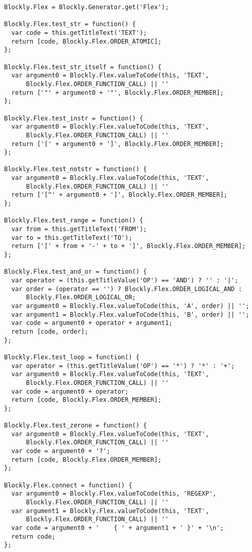 \documentclass{risepaper}
\begin{document}
\small
\begin{verbatim}
Blockly.Flex = Blockly.Generator.get('Flex');

Blockly.Flex.test_str = function() {
  var code = this.getTitleText('TEXT');
  return [code, Blockly.Flex.ORDER_ATOMIC];
};

Blockly.Flex.test_str_itself = function() {
  var argument0 = Blockly.Flex.valueToCode(this, 'TEXT',
      Blockly.Flex.ORDER_FUNCTION_CALL) || ''
  return ['"' + argument0 + '"', Blockly.Flex.ORDER_MEMBER];
};

Blockly.Flex.test_instr = function() {
  var argument0 = Blockly.Flex.valueToCode(this, 'TEXT',
      Blockly.Flex.ORDER_FUNCTION_CALL) || ''
  return ['[' + argument0 + ']', Blockly.Flex.ORDER_MEMBER];
};

Blockly.Flex.test_notstr = function() {
  var argument0 = Blockly.Flex.valueToCode(this, 'TEXT',
      Blockly.Flex.ORDER_FUNCTION_CALL) || ''
  return ['[^' + argument0 + ']', Blockly.Flex.ORDER_MEMBER];
};

Blockly.Flex.test_range = function() {
  var from = this.getTitleText('FROM');
  var to = this.getTitleText('TO');
  return ['[' + from + '-' + to + ']', Blockly.Flex.ORDER_MEMBER];
};

Blockly.Flex.test_and_or = function() {
  var operator = (this.getTitleValue('OP') == 'AND') ? '' : '|';
  var order = (operator == '') ? Blockly.Flex.ORDER_LOGICAL_AND :
      Blockly.Flex.ORDER_LOGICAL_OR;
  var argument0 = Blockly.Flex.valueToCode(this, 'A', order) || '';
  var argument1 = Blockly.Flex.valueToCode(this, 'B', order) || '';
  var code = argument0 + operator + argument1;
  return [code, order];
};

Blockly.Flex.test_loop = function() {
  var operator = (this.getTitleValue('OP') == '*') ? '*' : '+';
  var argument0 = Blockly.Flex.valueToCode(this, 'TEXT',
      Blockly.Flex.ORDER_FUNCTION_CALL) || ''
  var code = argument0 + operator;
  return [code, Blockly.Flex.ORDER_MEMBER];
};

Blockly.Flex.test_zerone = function() {
  var argument0 = Blockly.Flex.valueToCode(this, 'TEXT',
      Blockly.Flex.ORDER_FUNCTION_CALL) || ''
  var code = argument0 + '?';
  return [code, Blockly.Flex.ORDER_MEMBER];
};

Blockly.Flex.connect = function() {
  var argument0 = Blockly.Flex.valueToCode(this, 'REGEXP',
      Blockly.Flex.ORDER_FUNCTION_CALL) || ''
  var argument1 = Blockly.Flex.valueToCode(this, 'TEXT',
      Blockly.Flex.ORDER_FUNCTION_CALL) || ''
  var code = argument0 + '    { ' + argument1 + ' }' + '\n';
  return code;
};


\end{verbatim}
\end{document}
